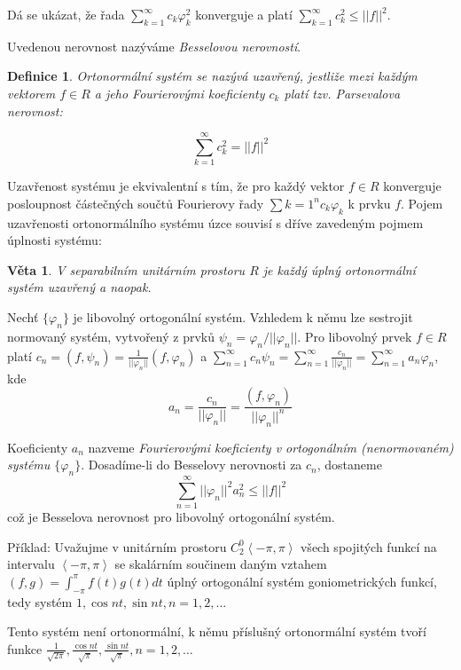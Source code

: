 \documentclass[a4paper, 11pt]{report}
\newtheorem{mydef}{Definice}[chapter]
\newtheorem{veta}{Věta}[chapter]
\begin{document}
Dá se ukázat, že řada $\sum\limits_{k=1}^\infty c_k \varphi_k^2$  konverguje a platí
$\sum\limits_{k=1}^\infty c_k^2 \leq ||f||^2$.

Uvedenou nerovnost nazýváme \emph{Besselovou nerovností}.

\begin{mydef}
Ortonormální systém se nazývá \emph{uzavřený}, jestliže mezi každým vektorem $f \in R$ a jeho Fourierovými koeficienty $c_k$ platí tzv. \emph{Parsevalova nerovnost}:

$$\sum\limits_{k=1}^\infty c_k^2 = ||f||^2$$
\end{mydef}

Uzavřenost systému je ekvivalentní s tím, že pro každý vektor $f \in R$ konverguje posloupnost částečných součtů Fourierovy řady $\sum{k=1}^n c_k \varphi_k$ k prvku $f$. Pojem uzavřenosti ortonormálního systému úzce souvisí s dříve zavedeným pojmem úplnosti systému:

\begin{veta}
V separabilním unitárním prostoru $R$ je každý úplný ortonormální systém uzavřený a naopak.
\end{veta}

Nechť $\{\varphi_n\}$ je libovolný ortogonální systém. Vzhledem k němu lze sestrojit normovaný systém, vytvořený z prvků $\psi_n = \varphi_n/||\varphi_n||$. Pro libovolný prvek $f \in R$ platí
$c_n = (f, \psi_n) = \frac{1}{||\varphi_n||}(f, \varphi_n)$ a 
$\sum_{n=1}^\infty c_n \psi_n = \sum_{n=1}^\infty \frac{c_n}{||\varphi_n||} = \sum_{n=1}^\infty a_n \varphi_n$, kde
$$a_n = \frac{c_n}{||\varphi_n||} = \frac{(f,\varphi_n)}{||\varphi_n||^n}$$

Koeficienty $a_n$ nazveme \emph{Fourierovými koeficienty v ortogonálním (nenormovaném) systému $\{\varphi_n\}$}. Dosadíme-li do Besselovy nerovnosti za $c_n$, dostaneme
$$\sum\limits_{n=1}^\infty ||\varphi_n||^2a_n^2 \leq ||f||^2$$
což je Besselova nerovnost pro libovolný ortogonální systém.

Příklad: Uvažujme v unitárním prostoru $C_2^0\left<-\pi, \pi\right>$ všech spojitých funkcí na intervalu $\left<-\pi, \pi\right>$ se skalárním součinem daným vztahem $(f, g) = \int_{-\pi}^\pi f(t) g(t) dt$ úplný ortogonální systém goniometrických funkcí, tedy systém
$1, \cos nt, \sin nt, n = 1, 2, \dots$

Tento systém není ortonormální, k němu příslušný ortonormální systém tvoří funkce
$\frac{1}{\sqrt{2\pi}}, \frac{\cos nt}{\sqrt{\pi}}, \frac{\sin nt}{\sqrt{\pi}}, n = 1, 2, \dots$
\end{document}
